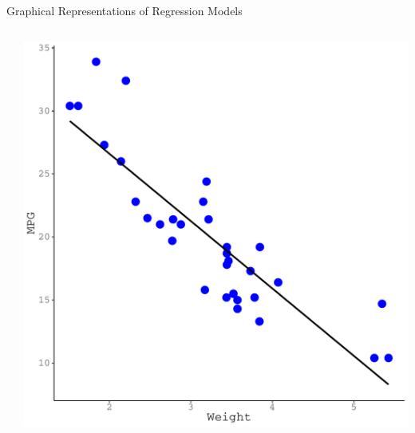 \documentclass[10pt]{beamer}\usepackage[]{graphicx}\usepackage[]{color}
\makeatletter
\def\maxwidth{ %
  \ifdim\Gin@nat@width>\linewidth
    \linewidth
  \else
    \Gin@nat@width
  \fi
}
\newenvironment{knitrout}{}{} %
\makeatother
\begin{document}
\begin{frame}{Graphical Representations of Regression Models}
\begin{columns}
\begin{column}{0.1\textwidth}
\end{column}

\begin{column}{0.45\textwidth}

\begin{knitrout}\footnotesize
{}\color{fgcolor}

{\centering \includegraphics[width=\maxwidth]{figure/unnamed-chunk-32-1} 

}


\end{knitrout}

\end{column}
\end{columns}

\end{frame}

\end{document}
